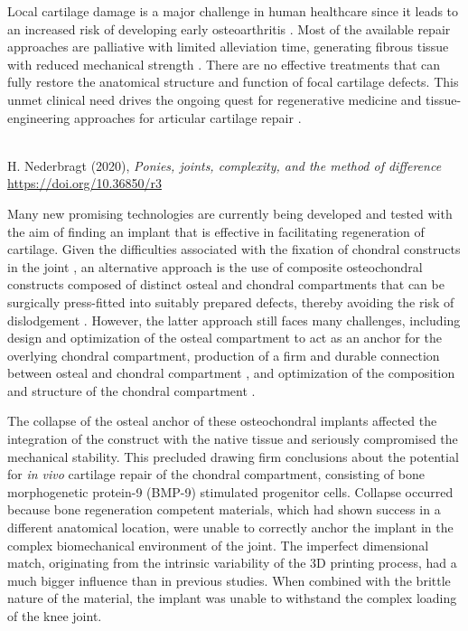 \documentclass[twocolumn, empirical, authordate, issue]{jote-new-article}
\begin{document}
\lettrine{L}ocal cartilage damage is a major challenge in human healthcare since it leads to an increased risk of developing early osteoarthritis \parencite{Kloppenburg2020}. Most of the available repair approaches are palliative with limited alleviation time, generating fibrous tissue with reduced mechanical strength \parencite{Kwon2019}. There are no effective treatments that can fully restore the anatomical structure and function of focal cartilage defects. This unmet clinical need drives the ongoing quest for regenerative medicine and tissue-engineering approaches for articular cartilage repair \parencite{Malda2019}.

\begin{companion} \\
\selectfont
H. Nederbragt (2020),\vskip5pt
\textit{Ponies, joints, complexity, and the method of difference}\vskip5pt
{\href{https://doi.org/10.36850/r3}{https://doi.org/10.36850/r3}}
\end{companion}


Many new promising technologies \parencite{Johnstone2019, Patel2019} are currently being developed and tested with the aim of finding an implant that is effective in facilitating regeneration of cartilage. Given the difficulties associated with the fixation of chondral constructs in the joint \parencite{Gotterbarm2008, Mancini2017}, an alternative approach is the use of composite osteochondral constructs composed of distinct osteal and chondral compartments that can be surgically press-fitted into suitably prepared defects, thereby avoiding the risk of dislodgement \parencite{Martin2007}. However, the latter approach still faces many challenges, including design and optimization of the osteal compartment to act as an anchor for the overlying chondral compartment, production of a firm and durable connection between osteal and chondral compartment \parencite{Boushell2017}, and optimization of the composition and structure of the chondral compartment \parencite{Diekman2013, Lee2014}.

\begin{takeHomeMessage}
The collapse of the osteal anchor of these osteochondral implants affected the integration of the construct with the native tissue and seriously compromised the mechanical stability. This precluded drawing firm conclusions about the potential for \emph{in vivo} cartilage repair of the chondral compartment, consisting of bone morphogenetic protein-9 (BMP-9) stimulated progenitor cells. Collapse occurred because bone regeneration competent materials, which had shown success in a different anatomical location, were unable to correctly anchor the implant in the complex biomechanical environment of the joint. The imperfect dimensional match, originating from the intrinsic variability of the 3D printing process, had a much bigger influence than in previous studies. When combined with the brittle nature of the material, the implant was unable to withstand the complex loading of the knee joint.
\end{takeHomeMessage}
\end{document}
